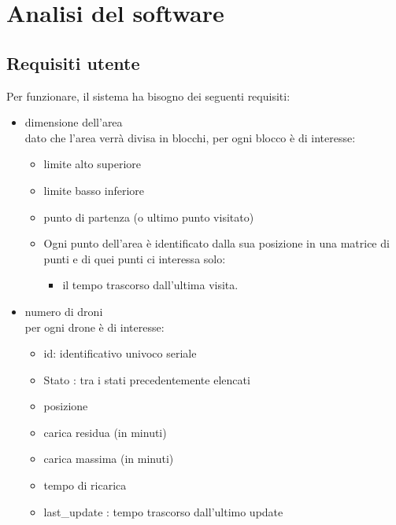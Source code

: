 \documentclass[a4paper, 11pt]{article}
\begin{document}
\section{Analisi del software}
\subsection{Requisiti utente}
Per funzionare, il sistema ha bisogno dei seguenti requisiti:
\begin{itemize}
    \item dimensione dell'area\\
    dato che l'area verrà divisa in blocchi, per ogni blocco è di interesse:
    \begin{itemize}
        \item limite alto superiore
        \item limite basso inferiore
        \item punto di partenza (o ultimo punto visitato)
        \item Ogni punto dell'area è identificato dalla sua posizione in una matrice di punti e di quei punti ci interessa solo:
        \begin{itemize}
            \item il tempo trascorso dall'ultima visita.
        \end{itemize}
    \end{itemize}
    \item numero di droni\\
    per ogni drone è di interesse:
    \begin{itemize}
        \item id: identificativo univoco seriale
        \item Stato : tra i stati precedentemente elencati
        \item posizione 
        \item carica residua (in minuti)
        \item carica massima (in minuti)
        \item tempo di ricarica 
        \item last\_update : tempo trascorso dall'ultimo update
    \end{itemize}
    
\end{itemize}
\newpage
\end{document}
